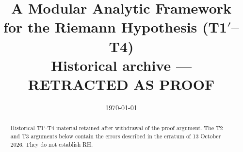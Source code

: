 \documentclass[11pt,a4paper]{proofarticle}
\title{A Modular Analytic Framework for the Riemann Hypothesis (T1$′$–T4)\\[2pt]
\large Historical archive --- RETRACTED AS PROOF}
\author{\InterIAauthors}
\date{\today}
\begin{document}

\maketitle

\begin{abstract}
Historical T1'-T4 material retained after withdrawal of the proof argument.
The T2 and T3 arguments below contain the errors described in the erratum
of 13 October 2026. They do not establish RH.
\end{abstract}





\appendix



\end{document}
